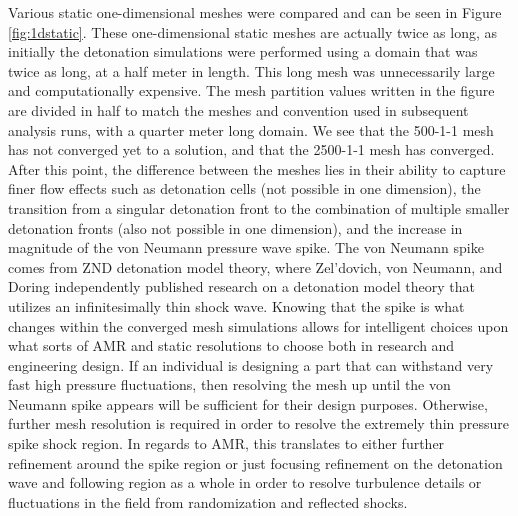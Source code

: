 Various static one-dimensional meshes were compared and can be seen in Figure \ref{fig:1dstatic}. These one-dimensional static meshes are actually twice as long, as initially the detonation simulations were performed using a domain that was twice as long, at a half meter in length. This long mesh was unnecessarily large and computationally expensive. The mesh partition values written in the figure are divided in half to match the meshes and convention used in subsequent analysis runs, with a quarter meter long domain. We see that the 500-1-1 mesh has not converged yet to a solution, and that the 2500-1-1 mesh has converged. After this point, the difference between the meshes lies in their ability to capture finer flow effects such as detonation cells (not possible in one dimension), the transition from a singular detonation front to the combination of multiple smaller detonation fronts (also not possible in one dimension), and the increase in magnitude of the von Neumann pressure wave spike. The von Neumann spike comes from ZND detonation model theory, where Zel'dovich\cite{zeldovich}, von Neumann\cite{neumann}, and Doring\cite{doring} independently published research on a detonation model theory that utilizes an infinitesimally thin shock wave. Knowing that the spike is what changes within the converged mesh simulations allows for intelligent choices upon what sorts of AMR and static resolutions to choose both in research and engineering design. If an individual is designing a part that can withstand very fast high pressure fluctuations, then resolving the mesh up until the von Neumann spike appears will be sufficient for their design purposes. Otherwise, further mesh resolution is required in order to resolve the extremely thin pressure spike shock region. In regards to AMR, this translates to either further refinement around the spike region or just focusing refinement on the detonation wave and following region as a whole in order to resolve turbulence details or fluctuations in the field from randomization and reflected shocks. 


